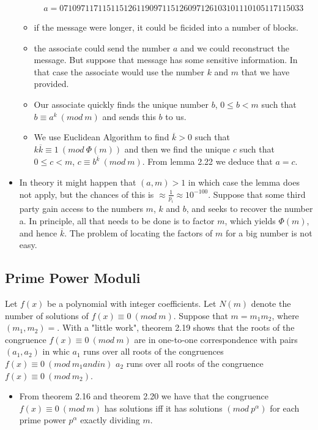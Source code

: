 \documentclass[a4paper]{article}
\begin{document}
\begin{itemize}
\begin{itemize}
        \begin{align*}
            a=071097117115115126119097115126097126103101110105117115033
        \end{align*}
        \item if the message were longer, it could be ficided into a number of blocks.
        \item the associate could send the number $a$ and we could reconstruct the message. But suppose that message has some sensitive information. In that case the associate would use the number $k$ and $m$ that we have provided.
        \item Our associate quickly finds the unique number $b$, $0\leq b<m$ such that $b\equiv a^k\ (mod\ m)$ and sends this $b$ to us.
        \item We use Euclidean Algorithm to find $\overline{k}>0$ such that\\
        $k\overline{k}\equiv 1\ (mod\ \Phi(m))$ and then we find the unique $c$ such that $0\leq c<m$, $c\equiv b^{\overline{k}}\ (mod\ m)$. From lemma 2.22 we deduce that $a=c$.
    \end{itemize}
    \item In theory it might happen that $(a,m)>1$ in which case the lemma does not apply, but the chances of this is $\approx\frac{1}{p_i}\approx 10^{-100}$. Suppose that some third party gain access to the numbers $m$, $k$ and $b$, and seeks to recover the number a. In principle, all that needs to be done is to factor $m$, which yields $\Phi(m)$, and hence $\overline{k}$. The problem of locating the factors of $m$ for a big number is not easy.
\end{itemize}


\subsection{Prime Power Moduli}

Let $f(x)$ be a polynomial with integer coefficients. Let $N(m)$ denote the number of solutions of $f(x)\equiv 0\ (mod\ m)$. Suppose that $m=m_1m_2$, where $(m_1,m_2)=$. With a "little work", theorem 2.19 shows that the roots of the congruence $f(x)\equiv 0\ (mod\ m)$ are in one-to-one correspondence with pairs $(a_1,a_2)$ in whic $a_1$ runs over all roots of the congruences $f(x)\equiv 0\ (mod\ m_1and in)$ $a_2$ runs over all roots of the congruence $f(x)\equiv 0\ (mod\ m_2)$.

\begin{itemize}
    \item From theorem 2.16 and theorem 2.20 we have that the congruence $f(x)\equiv 0\ (mod\ m)$ has solutions iff it has solutions $(mod\ p^\alpha)$ for each prime power $p^\alpha$ exactly dividing $m$.
\end{itemize}
\end{document}
